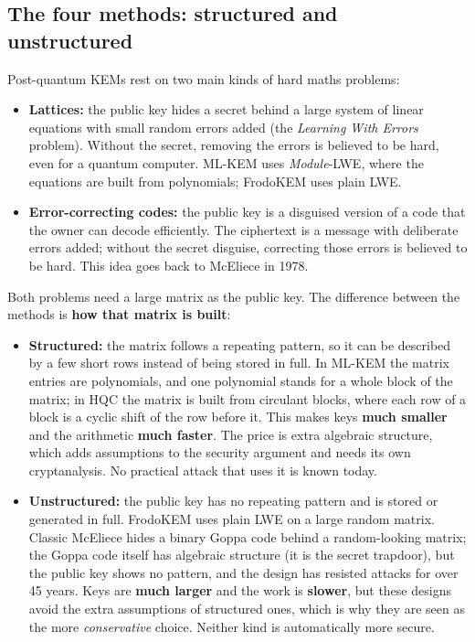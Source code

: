 \documentclass[11pt,a4paper]{article}
\begin{document}
\subsection{The four methods: structured and unstructured}
Post-quantum KEMs rest on two main kinds of hard maths problems:
\begin{itemize}
  \item \textbf{Lattices:} the public key hides a secret behind a large system of linear equations with small
  random errors added (the \emph{Learning With Errors} problem). Without the secret, removing the errors is
  believed to be hard, even for a quantum computer. ML-KEM uses \emph{Module}-LWE, where the equations are
  built from polynomials; FrodoKEM uses plain LWE.
  \item \textbf{Error-correcting codes:} the public key is a disguised version of a code that the owner can
  decode efficiently. The ciphertext is a message with deliberate errors added; without the secret
  disguise, correcting those errors is believed to be hard. This idea goes back to McEliece in 1978.
\end{itemize}

Both problems need a large matrix as the public key. The difference between the methods is \textbf{how that
matrix is built}:
\begin{itemize}
  \item \textbf{Structured:} the matrix follows a repeating pattern, so it can be described by a few short
  rows instead of being stored in full. In ML-KEM the matrix entries are polynomials, and one polynomial
  stands for a whole block of the matrix; in HQC the matrix is built from circulant blocks, where each row of
  a block is a cyclic shift of the row before it. This makes keys \textbf{much smaller} and the arithmetic
  \textbf{much faster}. The price is extra algebraic structure, which adds assumptions to the security
  argument and needs its own cryptanalysis. No practical attack that uses it is known today.
  \item \textbf{Unstructured:} the public key has no repeating pattern and is stored or generated in full.
  FrodoKEM uses plain LWE on a large random matrix. Classic McEliece hides a binary Goppa code behind a
  random-looking matrix; the Goppa code itself has algebraic structure (it is the secret trapdoor), but the
  public key shows no pattern, and the design has resisted attacks for over 45 years. Keys are \textbf{much
  larger} and the work is \textbf{slower}, but these designs avoid the extra assumptions of structured ones,
  which is why they are seen as the more \emph{conservative} choice. Neither kind is automatically more secure.
\end{itemize}
\end{document}
